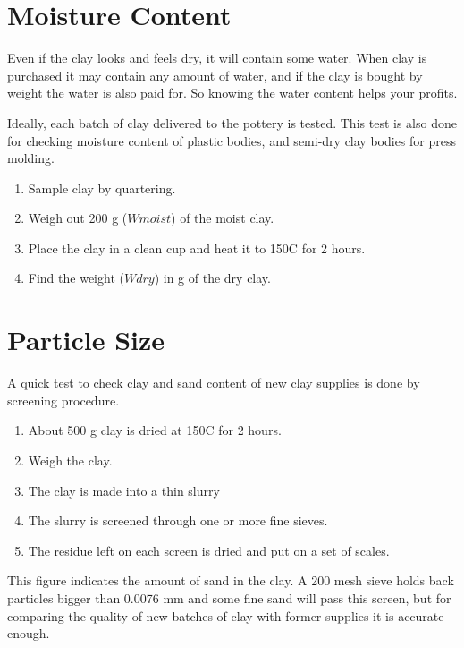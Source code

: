 \section{Moisture Content}
Even if the clay looks and feels dry, it will contain some water. When clay is 
purchased it may contain any amount of water, and if the clay is bought by 
weight the water is also paid for. So knowing the water content helps your 
profits.

Ideally, each batch of clay delivered to the pottery is tested. This test is 
also done for checking moisture content of plastic bodies, and semi-dry clay 
bodies for press molding.
\begin{enumerate}
\item Sample clay by quartering.
\item Weigh out 200 g ($W moist$) of the moist clay.
\item Place the clay in a clean cup and heat it to 150\degree C for 2 hours.
\item Find the weight ($W dry$) in g of the dry clay.
\end{enumerate}
\section{Particle Size}
A quick test to check clay and sand content of new clay supplies is done by 
screening procedure.
\begin{enumerate}
\item About 500 g clay is dried at 150\degree C for 2 hours.
\item Weigh the clay.
\item The clay is made into a thin slurry
\item The slurry is screened through one or more fine sieves.
\item The residue left on each screen is dried and put on a set of scales.
\end{enumerate}
This figure indicates the amount of sand in the clay. A 200 mesh sieve holds 
back particles bigger than 0.0076 mm and some fine sand will pass this screen, 
but for comparing the quality of new batches of clay with former supplies it is 
accurate enough.
